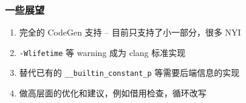 \begin{frame}
    \frametitle{一些展望}

    \begin{enumerate}
        \item 完全的 CodeGen 支持 -- 目前只支持了小一部分，很多 NYI
        \item \texttt{-Wlifetime} 等 warning 成为 clang 标准实现
        \item 替代已有的 \texttt{\_\_builtin\_constant\_p} 等需要后端信息的实现
        \item 做高层面的优化和建议，例如借用检查，循环改写
    \end{enumerate}

\end{frame}
